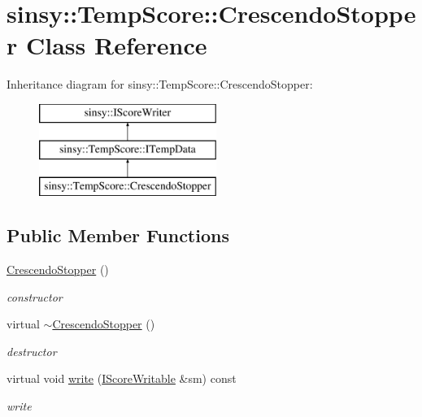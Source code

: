 \hypertarget{classsinsy_1_1TempScore_1_1CrescendoStopper}{\section{sinsy\-:\-:\-Temp\-Score\-:\-:\-Crescendo\-Stopper \-Class \-Reference}
\label{classsinsy_1_1TempScore_1_1CrescendoStopper}
}
\-Inheritance diagram for sinsy\-:\-:\-Temp\-Score\-:\-:\-Crescendo\-Stopper\-:\begin{figure}[H]
\begin{center}
\leavevmode
\includegraphics[height=3.000000cm]{classsinsy_1_1TempScore_1_1CrescendoStopper}
\end{center}
\end{figure}
\subsection*{\-Public \-Member \-Functions}
\begin{DoxyCompactItemize}
\item 
\hypertarget{classsinsy_1_1TempScore_1_1CrescendoStopper_a6fa1c3f68c4a760405ae72b131051fbd}{\hyperlink{classsinsy_1_1TempScore_1_1CrescendoStopper_a6fa1c3f68c4a760405ae72b131051fbd}{\-Crescendo\-Stopper} ()}\label{classsinsy_1_1TempScore_1_1CrescendoStopper_a6fa1c3f68c4a760405ae72b131051fbd}

\begin{DoxyCompactList}\small\item\em constructor \end{DoxyCompactList}\item 
\hypertarget{classsinsy_1_1TempScore_1_1CrescendoStopper_af1f1f4adb187c28592d56fc5d1ecbc42}{virtual \hyperlink{classsinsy_1_1TempScore_1_1CrescendoStopper_af1f1f4adb187c28592d56fc5d1ecbc42}{$\sim$\-Crescendo\-Stopper} ()}\label{classsinsy_1_1TempScore_1_1CrescendoStopper_af1f1f4adb187c28592d56fc5d1ecbc42}

\begin{DoxyCompactList}\small\item\em destructor \end{DoxyCompactList}\item 
\hypertarget{classsinsy_1_1TempScore_1_1CrescendoStopper_a1f99db8f1dc132386435e1b2c242341a}{virtual void \hyperlink{classsinsy_1_1TempScore_1_1CrescendoStopper_a1f99db8f1dc132386435e1b2c242341a}{write} (\hyperlink{classsinsy_1_1IScoreWritable}{\-I\-Score\-Writable} \&sm) const }\label{classsinsy_1_1TempScore_1_1CrescendoStopper_a1f99db8f1dc132386435e1b2c242341a}

\begin{DoxyCompactList}\small\item\em write \end{DoxyCompactList}\end{DoxyCompactItemize}


